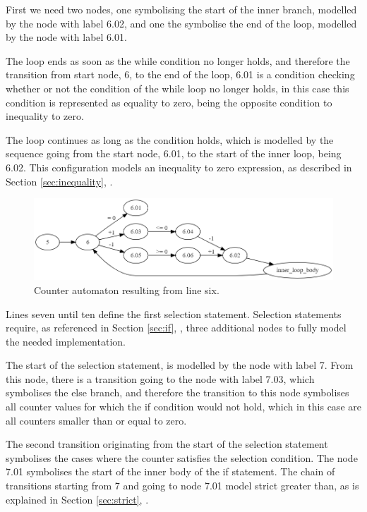 \documentclass[12pt]{article}
\begin{document}
First we need two nodes, one symbolising the start of the inner branch, modelled by the node with label 6.02, and one the symbolise the end of the loop, modelled by the node with label 6.01.

The loop ends as soon as the while condition no longer holds, and therefore the transition from start node, 6, to the end of the loop, 6.01 is a condition checking whether or not the condition of the while loop no longer holds, in this case this condition is represented as equality to zero, being the opposite condition to inequality to zero. 

The loop continues as long as the condition holds, which is modelled by the sequence going from the start node, 6.01, to the start of the inner loop, being 6.02. This configuration models an inequality to zero expression, as described in Section \ref{sec:inequality}, .

\begin{figure}[h]
	\centering
	\includegraphics[width=\linewidth]{final_overview_6}
	\caption{Counter automaton resulting from line six.}
	\label{fig:final_overview_6}
\end{figure}

Lines seven until ten define the first selection statement. Selection statements require, as referenced in Section \ref{sec:if}, , three additional nodes to fully model the needed implementation.

The start of the selection statement, is modelled by the node with label 7. From this node, there is a transition going to the node with label 7.03, which symbolises the else branch, and therefore the transition to this node symbolises all counter values for which the if condition would not hold, which in this case are all counters smaller than or equal to zero.

The second transition originating from the start of the selection statement symbolises the cases where the counter satisfies the selection condition. The node 7.01 symbolises the start of the inner body of the if statement. The chain of transitions starting from 7 and going to node 7.01 model strict greater than, as is explained in Section \ref{sec:strict}, .
\end{document}
